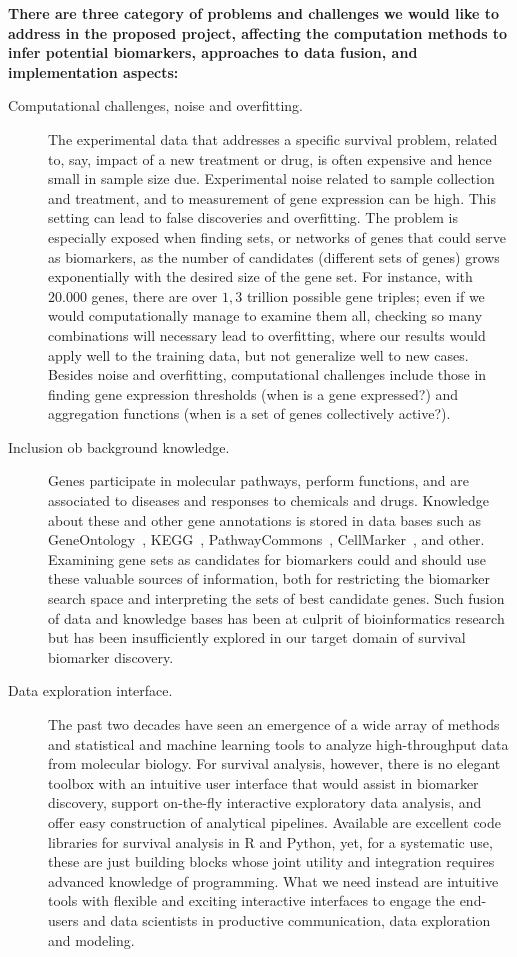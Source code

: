 \documentclass[11pt,a4paper]{article}
\renewcommand{\bold}{\textbf}
\begin{document}
\bold{There are three category of problems and challenges we would like to address in the proposed project, affecting the computation methods to infer potential biomarkers, approaches to data fusion, and implementation aspects:}
\begin{description}
	\item[Computational challenges, noise and overfitting.] The experimental data that addresses a specific survival problem, related to, say, impact of a new treatment or drug, is often expensive and hence small in sample size due. Experimental noise related to sample collection and treatment, and to measurement of gene expression can be high. This setting can lead to false discoveries and overfitting. The problem is especially exposed when finding sets, or networks of genes that could serve as biomarkers, as the number of candidates (different sets of genes) grows exponentially with the desired size of the gene set. For instance, with $20.000$ genes, there are over $1,3$ trillion possible gene triples; even if we would computationally manage to examine them all, checking so many combinations will necessary lead to overfitting, where our results would apply well to the training data, but not generalize well to new cases. Besides noise and overfitting, computational challenges include those in finding gene expression thresholds (when is a gene expressed?) and aggregation functions (when is a set of genes collectively active?).
	\item[Inclusion ob background knowledge.] Genes participate in molecular pathways, perform functions, and are associated to diseases and responses to chemicals and drugs. Knowledge about these and other gene annotations is stored in data bases such as GeneOntology~\cite{}, KEGG~\cite{}, PathwayCommons~\cite{}, CellMarker~\cite{}, and other. Examining gene sets as candidates for biomarkers could and should use these valuable sources of information, both for restricting the biomarker search space and interpreting the sets of best candidate genes. Such fusion of data and knowledge bases has been at culprit of bioinformatics research~\cite{} but has been insufficiently explored in our target domain of survival biomarker discovery.
	\item[Data exploration interface.] The past two decades have seen an emergence of a wide array of methods and statistical and machine learning tools to analyze high-throughput data from molecular biology. For survival analysis, however, there is no elegant toolbox with an intuitive user interface that would assist in biomarker discovery, support on-the-fly interactive exploratory data analysis, and offer easy construction of analytical pipelines. Available are excellent code libraries for survival analysis in R and Python, yet, for a systematic use, these are just building blocks whose joint utility and integration requires advanced knowledge of programming. What we need instead are intuitive tools with flexible and exciting interactive interfaces to engage the end-users and data scientists in productive communication, data exploration and modeling.
\end{description}
\end{document}
